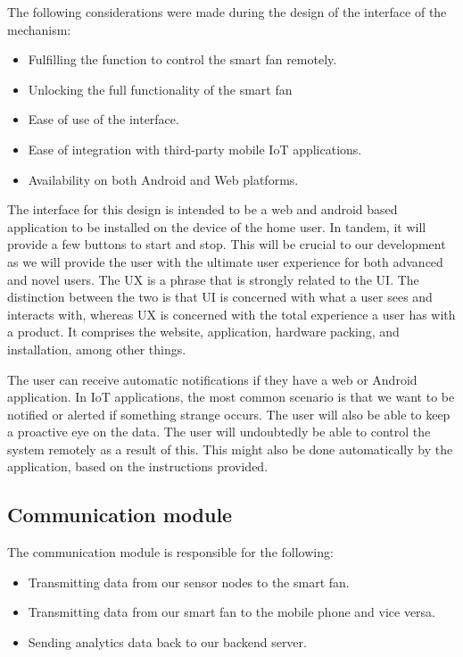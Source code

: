 The following considerations were made during the design of the interface of the mechanism:
\begin{itemize}
\item Fulfilling the function to control the smart fan remotely.
\item Unlocking the full functionality of the smart fan
\item Ease of use of the interface.
\item Ease of integration with third-party mobile \ac{IoT} applications.
\item Availability on both Android and Web platforms.
\end{itemize}

The interface for this design is intended to be a web and android based application to be installed on the device of the home user. In tandem, it will provide a few buttons to start and stop. This will be crucial to our development as we will provide the user with the ultimate user experience for both advanced and novel users.
The \ac{UX} is a phrase that is strongly related to the \ac{UI}. The distinction between the two is that \ac{UI} is concerned with what a user sees and interacts with, whereas \ac{UX} is concerned with the total experience a user has with a product. It comprises the website, application, hardware packing, and installation, among other things.
\par
The user can receive automatic notifications if they have a web or Android application. In \ac{IoT} applications, the most common scenario is that we want to be notified or alerted if something strange occurs. The user will also be able to keep a proactive eye on the data. The user will undoubtedly be able to control the system remotely as a result of this. This might also be done automatically by the application, based on the instructions provided.

\subsection{Communication module}

The communication module is responsible for the following:

\begin{itemize}
\item Transmitting data from our sensor nodes to the smart fan.
\item Transmitting data from our smart fan to the mobile phone and vice versa.
\item Sending analytics data back to our backend server.
\end{itemize}

